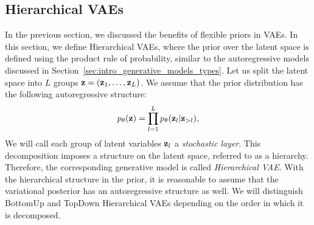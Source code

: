 \subsection{Hierarchical VAEs}
In the previous section, we discussed the benefits of flexible priors in VAEs.
In this section, we define Hierarchical VAEs, where the prior over the latent space is defined using the product rule of probability, similar to the autoregressive models discussed in Section~\ref{sec:intro_generative_models_types}. 
Let us split the latent space into $L$ groups ${\mathbf{z}} = ({\mathbf{z}}_1, \dots, {\mathbf{z}}_L)$. We assume that the prior distribution has the following autoregressive structure:
\begin{equation}
    p_{\theta}({\mathbf{z}}) = \prod_{l=1}^L p_{\theta}({\mathbf{z}}_l|{\mathbf{z}}_{>l}),
\end{equation}
\newline
We will call each group of latent variables ${\mathbf{z}}_l$ a \textit{stochastic layer}. This decomposition imposes a structure on the latent space, referred to as a hierarchy. Therefore, the corresponding generative model is called \textit{Hierarchical VAE}. 
With the hierarchical structure in the prior, it is reasonable to assume that the variational posterior has an autoregressive structure as well. We will distinguish BottomUp and TopDown Hierarchical VAEs depending on the order in which it is decomposed. 

